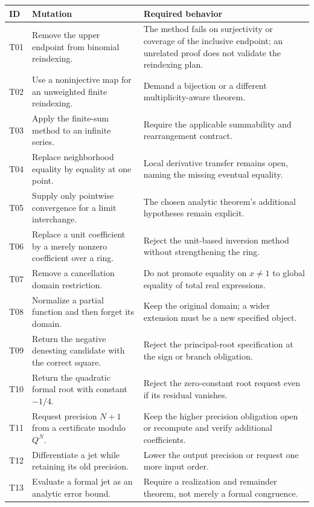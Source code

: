 \documentclass[11pt,letterpaper]{article}
\theoremstyle{definition}
\theoremstyle{remark}
\begin{document}
\small
\begin{longtable}{@{}P{.06\textwidth}P{.41\textwidth}P{.45\textwidth}@{}}
\toprule
ID & Mutation & Required behavior\\
\midrule
\endhead
T01 & Remove the upper endpoint from binomial reindexing. & The method fails on
surjectivity or coverage of the inclusive endpoint; an unrelated proof does
not validate the reindexing plan.\\
T02 & Use a noninjective map for an unweighted finite reindexing. & Demand a
bijection or a different multiplicity-aware theorem.\\
T03 & Apply the finite-sum method to an infinite series. & Require the applicable
summability and rearrangement contract.\\
T04 & Replace neighborhood equality by equality at one point. & Local derivative
transfer remains open, naming the missing eventual equality.\\
T05 & Supply only pointwise convergence for a limit interchange. & The chosen
analytic theorem's additional hypotheses remain explicit.\\
T06 & Replace a unit coefficient by a merely nonzero coefficient over a ring. &
Reject the unit-based inversion method without strengthening the ring.\\
T07 & Remove a cancellation domain restriction. & Do not promote equality on
$x\neq1$ to global equality of total real expressions.\\
T08 & Normalize a partial function and then forget its domain. & Keep the original
domain; a wider extension must be a new specified object.\\
T09 & Return the negative denesting candidate with the correct square. & Reject
the principal-root specification at the sign or branch obligation.\\
T10 & Return the quadratic formal root with constant $-1/4$. & Reject the
zero-constant root request even if its residual vanishes.\\
T11 & Request precision $N+1$ from a certificate modulo $Q^N$. & Keep the higher
precision obligation open or recompute and verify additional coefficients.\\
T12 & Differentiate a jet while retaining its old precision. & Lower the output
precision or request one more input order.\\
T13 & Evaluate a formal jet as an analytic error bound. & Require a realization
and remainder theorem, not merely a formal congruence.\\

\end{longtable}
\end{document}
